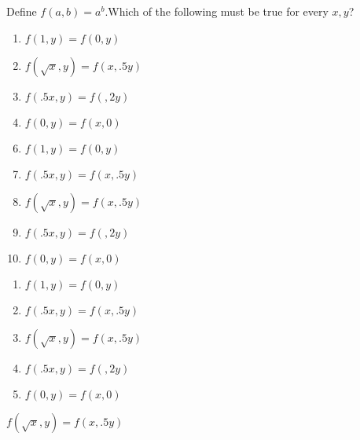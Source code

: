 



 Define $f(a,b)=a^{b}$.Which of the following must be true for every $x,y$? 


\ifsat
	\begin{enumerate}[label=\Alph*)]
		\item   $f(1,y)=f(0,y)$
		\item  $f(\sqrt{x},y)=f(x,.5y)$%
		\item  $f(.5x,y)=f(,2y)$
		\item  $f(0,y)=f(x,0)$
	\end{enumerate}
\else
\fi

\ifacteven
	\begin{enumerate}[label=\textbf{\Alph*.},itemsep=\fill,align=left]
		\setcounter{enumii}{5}
		\item   $f(1,y)=f(0,y)$
		\item  $f(.5x,y)=f(x,.5y)$
		\item  $f(\sqrt{x},y)=f(x,.5y)$%
		\addtocounter{enumii}{1}
		\item  $f(.5x,y)=f(,2y)$
		\item  $f(0,y)=f(x,0)$
	\end{enumerate}
\else
\fi

\ifactodd
	\begin{enumerate}[label=\textbf{\Alph*.},itemsep=\fill,align=left]
		\item   $f(1,y)=f(0,y)$
		\item  $f(.5x,y)=f(x,.5y)$
		\item  $f(\sqrt{x},y)=f(x,.5y)$%
		\item  $f(.5x,y)=f(,2y)$
		\item  $f(0,y)=f(x,0)$
	\end{enumerate}
\else
\fi

\ifgridin
  $f(\sqrt{x},y)=f(x,.5y)$%
		
\else
\fi

